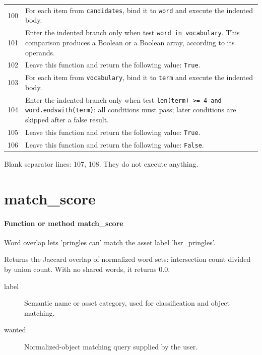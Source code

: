 \documentclass[11pt,a4paper]{book}
\begin{document}
\begin{longtable}{r p{}}
100 & For each item from \texttt{candidates}, bind it to \texttt{word} and execute the indented body. \\

101 & Enter the indented branch only when test \texttt{word in vocabulary}. This comparison produces a Boolean or a Boolean array, according to its operands. \\

102 & Leave this function and return the following value: \texttt{True}. \\

103 & For each item from \texttt{vocabulary}, bind it to \texttt{term} and execute the indented body. \\

104 & Enter the indented branch only when test \texttt{len(term) >= 4 and word.endswith(term)}: all conditions must pass; later conditions are skipped after a false result. \\

105 & Leave this function and return the following value: \texttt{True}. \\

106 & Leave this function and return the following value: \texttt{False}. \\

\end{longtable}

Blank separator lines: 107, 108. They do not execute anything.

\section{match\_score}

\paragraph{Function or method match\_score}
Word overlap lets 'pringles can' match the asset label 'hsr\_pringles'.

Returns the Jaccard overlap of normalized word sets: intersection count divided by union count. With no shared words, it returns 0.0.

\begin{description}
\item[label] Semantic name or asset category, used for classification and object matching.
\item[wanted] Normalized-object matching query supplied by the user.
\end{description}
\end{document}
